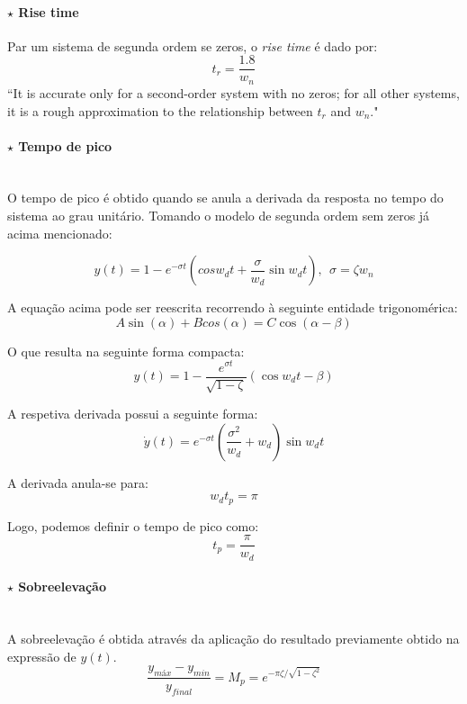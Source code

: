 \paragraph[2.1.3.1 Rise time]{$\pmb{\star}$ Rise time}\mbox{}

\noindent Par um sistema de segunda ordem se zeros, o  \textit{rise time} é dado por:
$$
\boxed{t_r = \dfrac{1.8}{w_n}}
$$
\noindent ``It is accurate only for a second-order system with no zeros; for all other systems, it is a rough approximation to the relationship between $t_r$ and $w_n$."\cite{FranklinPowell2015}

\paragraph[2.1.3.2 Tempo de pico]{$\pmb{\star}$ Tempo de pico}\mbox{}\\

\noindent O tempo de pico é obtido quando se anula a derivada da resposta no tempo do sistema ao grau unitário. Tomando o modelo de segunda ordem sem zeros já acima mencionado:

$$
    y(t) = 1 - e^{-\sigma t}\left(cos w_d t + \dfrac{\sigma}{w_d}\sin w_d t\right),\;\, \sigma = \zeta w_n
$$

A equação acima pode ser reescrita recorrendo à seguinte entidade trigonomérica:
$$
    A\sin(\alpha) + Bcos(\alpha) = C\cos(\alpha - \beta)
$$

\noindent O que resulta na seguinte forma compacta:
$$
    y(t) = 1 - \dfrac{e^{\sigma t}}{\sqrt{1 - \zeta}}\left(\cos{w_d t - \beta}\right)
$$

\noindent A respetiva derivada possui a seguinte forma:
$$
    \dot{y}(t) = e^{-\sigma t}\left(\dfrac{\sigma^2}{w_d} + w_d\right)\sin{w_d t}
$$

\noindent A derivada anula-se para:
$$
    w_d t_p = \pi
$$

\noindent Logo, podemos definir o tempo de pico como:
$$
    \boxed{t_p = \dfrac{\pi}{w_d}}
$$

\paragraph[2.1.3.4 Sobreelevação]{$\pmb{\star}$ Sobreelevação}\mbox{}\\

\noindent A sobreelevação é obtida através da aplicação do resultado previamente obtido na expressão de $y(t)$.
$$
    \boxed{\dfrac{y_{\textit{máx}} - y_{min}}{y_{final}} = M_p = e^{-\pi \zeta / \sqrt{1 - \zeta^2}}}
$$

